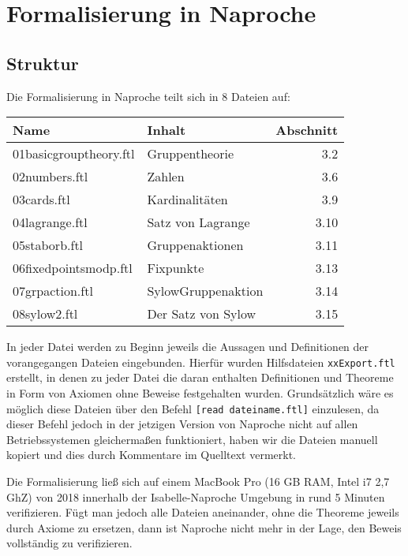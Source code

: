\documentclass[a4paper,12pt]{scrartcl}
\begin{document}
\section{Formalisierung in Naproche}


\subsection{Struktur }
Die Formalisierung in Naproche teilt sich in 8 Dateien auf:

\medskip

\begin{tabularx}{\textwidth}{p{}|X|r}
	Name & Inhalt & Abschnitt\\
	\hline
	01basicgrouptheory.ftl 		& Gruppentheorie		& 3.2\\
	\hline
	02numbers.ftl		& Zahlen		& 3.6\\
	\hline
	03cards.ftl			& Kardinalitäten		& 3.9\\
	\hline
	04lagrange.ftl 		& Satz von Lagrange		& 3.10\\
	\hline
	05staborb.ftl		& Gruppenaktionen		& 3.11\\
	\hline
	06fixedpointsmodp.ftl		& Fixpunkte		& 3.13\\
	\hline
	07grpaction.ftl 	& SylowGruppenaktion		& 3.14\\
	\hline
	08sylow2.ftl & Der Satz von Sylow  & 3.15 \\

\end{tabularx}

\medskip

In jeder Datei werden zu Beginn jeweils die Aussagen und Definitionen der vorangegangen Dateien eingebunden. Hierfür wurden Hilfsdateien \verb!xxExport.ftl! erstellt, in denen zu jeder Datei die daran enthalten Definitionen und Theoreme in Form von Axiomen ohne Beweise festgehalten wurden.
Grundsätzlich wäre es möglich diese Dateien über den Befehl \verb![read dateiname.ftl]! einzulesen, da dieser Befehl jedoch in der jetzigen Version von Naproche nicht auf allen Betriebssystemen gleichermaßen funktioniert, haben wir die Dateien manuell kopiert und dies durch Kommentare im Quelltext vermerkt.

Die Formalisierung ließ sich auf einem MacBook Pro (16 GB RAM, Intel i7 2,7 GhZ) von 2018 innerhalb der Isabelle-Naproche Umgebung\cite{bibtex.f} in rund 5 Minuten verifizieren. Fügt man jedoch alle Dateien aneinander, ohne die Theoreme jeweils durch Axiome zu ersetzen, dann ist Naproche nicht mehr in der Lage, den Beweis vollständig zu verifizieren.
\end{document}
